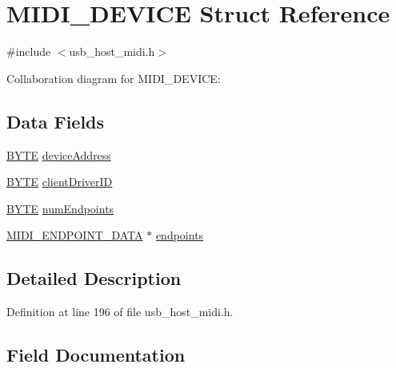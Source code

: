 \hypertarget{struct_m_i_d_i___d_e_v_i_c_e}{}\section{M\+I\+D\+I\+\_\+\+D\+E\+V\+I\+C\+E Struct Reference}
\label{struct_m_i_d_i___d_e_v_i_c_e}


{\ttfamily \#include $<$usb\+\_\+host\+\_\+midi.\+h$>$}



Collaboration diagram for M\+I\+D\+I\+\_\+\+D\+E\+V\+I\+C\+E\+:
\subsection*{Data Fields}
\begin{DoxyCompactItemize}
\item 
\hyperlink{_generic_type_defs_8h_a4ae1dab0fb4b072a66584546209e7d58}{B\+Y\+T\+E} \hyperlink{struct_m_i_d_i___d_e_v_i_c_e_aa1d659071a17ee8d0172d34d6783b517}{device\+Address}
\item 
\hyperlink{_generic_type_defs_8h_a4ae1dab0fb4b072a66584546209e7d58}{B\+Y\+T\+E} \hyperlink{struct_m_i_d_i___d_e_v_i_c_e_a343912ad63712ea60903f5acd92efc9e}{client\+Driver\+I\+D}
\item 
\hyperlink{_generic_type_defs_8h_a4ae1dab0fb4b072a66584546209e7d58}{B\+Y\+T\+E} \hyperlink{struct_m_i_d_i___d_e_v_i_c_e_a3954ebb7f1ab01729d786f773a1c577f}{num\+Endpoints}
\item 
\hyperlink{struct_m_i_d_i___e_n_d_p_o_i_n_t___d_a_t_a}{M\+I\+D\+I\+\_\+\+E\+N\+D\+P\+O\+I\+N\+T\+\_\+\+D\+A\+T\+A} $\ast$ \hyperlink{struct_m_i_d_i___d_e_v_i_c_e_a46d14c1e74e6c158ffacfc8d79ee560a}{endpoints}
\end{DoxyCompactItemize}


\subsection{Detailed Description}


Definition at line 196 of file usb\+\_\+host\+\_\+midi.\+h.



\subsection{Field Documentation}
\hypertarget{struct_m_i_d_i___d_e_v_i_c_e_a343912ad63712ea60903f5acd92efc9e}{}
